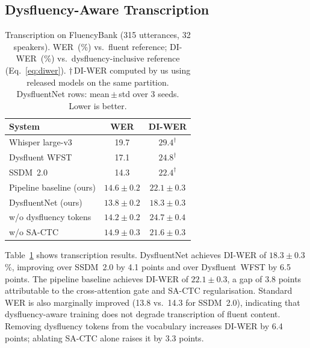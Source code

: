 \documentclass[cameraready]{Interspeech}
\begin{document}
\subsection{Dysfluency-Aware Transcription}

\begin{table}[t]
    \centering
    \caption{Transcription on FluencyBank (315 utterances, 32 speakers).
    WER~(\%) vs.\ fluent reference; DI-WER~(\%)
    vs.\ dysfluency-inclusive reference (Eq.~\eqref{eq:diwer}).
    $\dagger$\,DI-WER computed by us using released models on the same
    partition. DysfluentNet rows: mean\,$\pm$\,std over 3 seeds. Lower
    is better.}
    \label{tab:transcription}
    \renewcommand{\arraystretch}{1.1}
    \begin{tabular}{lcc}
        \toprule
        \textbf{System} & \textbf{WER} & \textbf{DI-WER} \\
        \midrule
        Whisper large-v3~\cite{radford2023whisper}
            & 19.7 & $29.4^\dagger$ \\
        Dysfluent WFST~\cite{guo2025wfst}
            & 17.1 & $24.8^\dagger$ \\
        SSDM~2.0~\cite{lian2025ssdm2}
            & 14.3 & $22.4^\dagger$ \\
        Pipeline baseline (ours)
            & $14.6 \pm 0.2$ & $22.1 \pm 0.3$ \\
        \midrule
        DysfluentNet (ours)
            & $\mathbf{13.8 \pm 0.2}$ & $\mathbf{18.3 \pm 0.3}$ \\
        \quad w/o dysfluency tokens
            & $14.2 \pm 0.2$ & $24.7 \pm 0.4$ \\
        \quad w/o SA-CTC
            & $14.9 \pm 0.3$ & $21.6 \pm 0.3$ \\
        \bottomrule
    \end{tabular}
\end{table}

Table~\ref{tab:transcription} shows transcription results. DysfluentNet
achieves DI-WER of $18.3 \pm 0.3$\%, improving over SSDM~2.0 by 4.1 points
and over Dysfluent~WFST by 6.5 points. The pipeline baseline achieves DI-WER
of $22.1 \pm 0.3$, a gap of 3.8 points attributable to the cross-attention gate
and SA-CTC regularisation. Standard WER is also marginally improved (13.8 vs.\
14.3 for SSDM~2.0), indicating that dysfluency-aware training does not degrade
transcription of fluent content. Removing dysfluency tokens from the vocabulary
increases DI-WER by 6.4 points; ablating SA-CTC alone raises it by 3.3 points.
\end{document}

